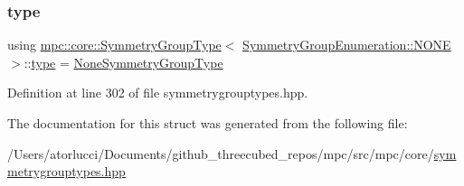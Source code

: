 \subsubsection{\texorpdfstring{type}{type}}
{\footnotesize\ttfamily using \mbox{\hyperlink{structmpc_1_1core_1_1_symmetry_group_type}{mpc\+::core\+::\+Symmetry\+Group\+Type}}$<$ \mbox{\hyperlink{namespacempc_1_1core_a9d979684062547055a0ef5c13077bad8ab50339a10e1de285ac99d4c3990b8693}{Symmetry\+Group\+Enumeration\+::\+N\+O\+NE}} $>$\+::\mbox{\hyperlink{structmpc_1_1core_1_1_symmetry_group_type_3_01_symmetry_group_enumeration_1_1_n_o_n_e_01_4_a502f9bba4f27dfdb37eb97b82c48545a}{type}} =  \mbox{\hyperlink{structmpc_1_1core_1_1_none_symmetry_group_type}{None\+Symmetry\+Group\+Type}}}



Definition at line 302 of file symmetrygrouptypes.\+hpp.



The documentation for this struct was generated from the following file\+:\begin{DoxyCompactItemize}
\item 
/\+Users/atorlucci/\+Documents/github\+\_\+threecubed\+\_\+repos/mpc/src/mpc/core/\mbox{\hyperlink{symmetrygrouptypes_8hpp}{symmetrygrouptypes.\+hpp}}\end{DoxyCompactItemize}
